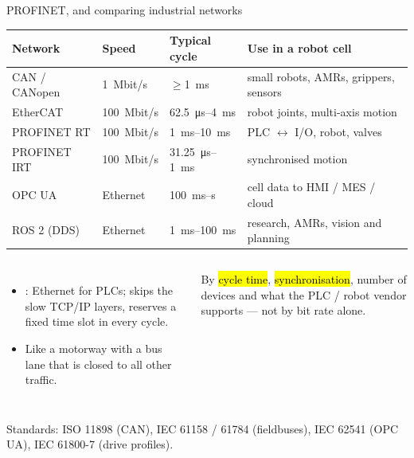 \documentclass[aspectratio=169,10pt]{beamer}
\begin{document}
\begin{frame}{PROFINET, and comparing industrial networks}
\small
\renewcommand{\arraystretch}{1.15}
\begin{tabularx}{\linewidth}{@{}l l l X@{}}
\toprule
\textbf{Network} & \textbf{Speed} & \textbf{Typical cycle} & \textbf{Use in a robot cell}\\
\midrule
CAN / CANopen & \SI{1}{Mbit/s} & $\ge$\SI{1}{ms} & small robots, AMRs, grippers, sensors\\
EtherCAT & \SI{100}{Mbit/s} & \SI{62.5}{\micro s}--\SI{4}{ms} & robot joints, multi-axis motion\\
PROFINET RT & \SI{100}{Mbit/s} & \SIrange{1}{10}{ms} & PLC $\leftrightarrow$ I/O, robot, valves\\
PROFINET IRT & \SI{100}{Mbit/s} & \SI{31.25}{\micro s}--\SI{1}{ms} & synchronised motion\\
OPC UA & Ethernet & \SI{100}{ms}--s & cell data to HMI / MES / cloud\\
ROS 2 (DDS) & Ethernet & \SIrange{1}{100}{ms} & research, AMRs, vision and planning\\
\bottomrule
\end{tabularx}

\vspace{3mm}
\begin{columns}[T]
\begin{itemize}\small
\item {}: Ethernet for PLCs;  skips the slow TCP/IP layers,  reserves a fixed time slot in every cycle.
\item Like a motorway with a bus lane that is closed to all other traffic.
\end{itemize}
\begin{keybox}
\small By \hl{cycle time}, \hl{synchronisation}, number of devices and what the PLC / robot vendor supports --- not by bit rate alone.
\end{keybox}
\end{columns}
{\scriptsize\color{mkGray} Standards: ISO 11898 (CAN), IEC 61158 / 61784 (fieldbuses), IEC 62541 (OPC UA), IEC 61800-7 (drive profiles).}
\end{frame}
\end{document}

